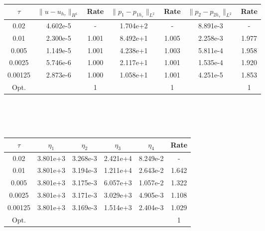 \clearpage

\begin{center} 
\centering
\small
\begin{tabular}{c|c|c|c|c|c|c}
$\tau$ & $\|u-u_{h_{\tau}}\|_{H^1}$ & Rate & $\|p_1-p_{1h_{\tau}}\|_{L^2}$ & Rate & $\|p_2-p_{2h_{\tau}}\|_{L^2}$ & Rate \\\hline
0.02   	& 4.602e-5 & -     & 1.704e+2 & -     & 8.891e-3 &  -    \\
0.01   	& 2.300e-5 & 1.001 & 8.492e+1 & 1.005 & 2.258e-3 & 1.977 \\
0.005  	& 1.149e-5 & 1.001 & 4.238e+1 & 1.003 & 5.811e-4 & 1.958 \\
0.0025  & 5.746e-6 & 1.000 & 2.117e+1 & 1.001 & 1.535e-4 & 1.920 \\
0.00125 & 2.873e-6 & 1.000 & 1.058e+1 & 1.001 & 4.251e-5 & 1.853 \\ \hline
Opt. & & 1 & & 1  & & 1
\end{tabular}
\normalsize
{} \label{tab:bb_bio_time_error}
\end{center}
\mbox{} \\ \\ \\ 
\begin{center} 
\centering
\begin{tabular}{c|c|c|c|c|c}
$\tau$ & $\eta_1$ & $\eta_2$ & $\eta_3$ & $\eta_4$ & Rate\\\hline
0.02    & 3.801e+3 & 3.268e-3 & 2.421e+4 & 8.249e-2 & -    \\
0.01    & 3.801e+3 & 3.194e-3 & 1.211e+4 & 2.643e-2 & 1.642\\
0.005   & 3.801e+3 & 3.175e-3 & 6.057e+3 & 1.057e-2 & 1.322\\
0.0025  & 3.801e+3 & 3.171e-3 & 3.029e+3 & 4.905e-3 & 1.108\\
0.00125 & 3.801e+3 & 3.169e-3 & 1.514e+3 & 2.404e-3 & 1.029\\\hline
Opt. & & & & & 1
\end{tabular}
 \label{tab:bb_bio_time_est}
\end{center}
\mbox{}\\ \\ \\ \\

